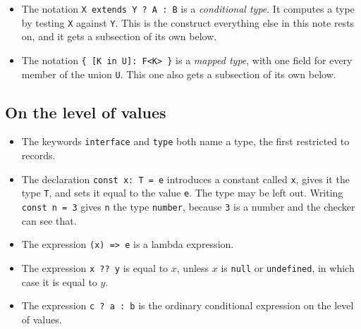 \documentclass[11pt,a4paper]{article}
\begin{document}
\begin{listbox}
\begin{itemize}\setlength{\itemsep}{2pt}

\item The notation \texttt{X extends Y ? A : B} is a \emph{conditional type}. It computes a type
      by testing \texttt{X} against \texttt{Y}. This is the construct everything else in this
      note rests on, and it gets a subsection of its own below.

\item The notation \texttt{\{ [K in U]: F<K> \}} is a \emph{mapped type}, with one field for
      every member of the union \texttt{U}. This one also gets a subsection of its own below.

\end{itemize}
\end{listbox}

\subsection{On the level of values}

\begin{listbox}
\begin{itemize}\setlength{\itemsep}{2pt}

\item The keywords \texttt{interface} and \texttt{type} both name a type, the first restricted to
      records.

\item The declaration \texttt{const x: T = e} introduces a constant called \texttt{x}, gives it
      the type \texttt{T}, and sets it equal to the value \texttt{e}. The type may be left out.
      Writing \texttt{const n = 3} gives \texttt{n} the type \texttt{number}, because \texttt{3}
      is a number and the checker can see that.

\item The expression \texttt{(x) => e} is a lambda expression.

\item The expression \texttt{x ?? y} is equal to $x$, unless $x$ is \texttt{null} or
      \texttt{undefined}, in which case it is equal to $y$.

\item The expression \texttt{c ? a : b} is the ordinary conditional expression on the level of
      values.

\end{itemize}
\end{listbox}
\end{document}
